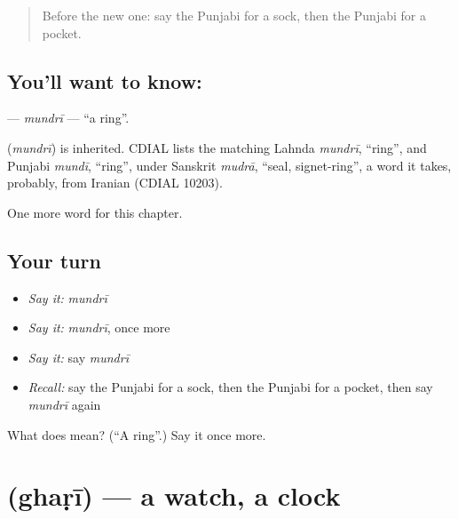 \label{lesson:PA-C93-mundri}



\begin{quote}
Before the new one: say the Punjabi for a sock, then the Punjabi for a pocket.
\end{quote}

\subsection*{You'll want to know: }
\textbf{} — \emph{mundrī} — \textquotedblleft{}a ring\textquotedblright{}.

\begin{cousinweb}
\textbf{} (\emph{mundrī}) is inherited. CDIAL lists the matching Lahnda \emph{mundrī}, \textquotedblleft{}ring\textquotedblright{}, and Punjabi \emph{mundī}, \textquotedblleft{}ring\textquotedblright{}, under Sanskrit \emph{mudrā}, \textquotedblleft{}seal, signet-ring\textquotedblright{}, a word it takes, probably, from Iranian (CDIAL 10203).
\end{cousinweb}

\begin{grammarlens}[title={What you've built}]
One more word for this chapter.
\end{grammarlens}

\subsection*{Your turn}
\begin{itemize}
\raggedright
  \item \emph{Say it:} \emph{mundrī}
  \item \emph{Say it:} \emph{mundrī}, once more
  \item \emph{Say it:} say \emph{mundrī}
  \item \emph{Recall:} say the Punjabi for a sock, then the Punjabi for a pocket, then say \emph{mundrī} again
\end{itemize}

\begin{tcolorbox}[breakable,colback=teal!4,colframe=teal!35!black,title={Before you move on}]
What does  mean? (\textquotedblleft{}A ring\textquotedblright{}.) Say it once more.
\end{tcolorbox}
\section[\texorpdfstring{\pa{ਘੜੀ} (ghaṛī)}{ਘੜੀ (ghaṛī)}]{ (ghaṛī) — a watch, a clock}


